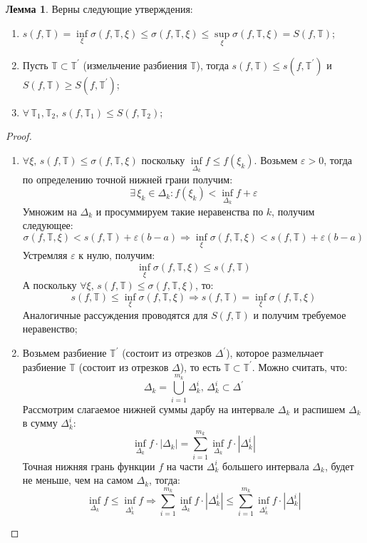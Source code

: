 \documentclass[12pt]{article}
\newcommand{\MTB}{\mathbb{T}}
\newcommand{\VE}{\varepsilon}
\theoremstyle{definition}
\newtheorem{lemma}{Лемма}
\begin{document}
\begin{lemma}
	Верны следующие утверждения:
	\begin{enumerate}[label={(\arabic*)}]
		\item $s(f,\MTB) = \inf\limits_{\xi}\sigma(f,\MTB,\xi) \leq \sigma(f,\MTB,\xi) \leq \sup\limits_{\xi}\sigma(f,\MTB,\xi) = S(f,\MTB)$;
		\item Пусть $\MTB \subset \MTB^\prime$ (измельчение разбиения $\MTB$), тогда $s(f,\MTB) \leq s(f,\MTB^\prime)$ и $S(f,\MTB) \geq S(f,\MTB^\prime)$;
		\item $\forall \, \MTB_1, \MTB_2, \, s(f,\MTB_1) \leq S(f,\MTB_2)$;
	\end{enumerate}
\end{lemma}
\begin{proof}\hfill
	\begin{enumerate}[label={(\arabic*)}]
		\item $\forall \xi, \, s(f,\MTB) \leq \sigma(f,\MTB,\xi)$ поскольку $\inf\limits_{\Delta_k}f \leq f(\xi_k)$. Возьмем $\VE > 0$, тогда по определению точной нижней грани получим:
		$$
			\exists \, \xi_k \in \Delta_k \colon f(\xi_k) < \inf\limits_{\Delta_k}f + \VE
		$$
		Умножим на $\Delta_k$ и просуммируем такие неравенства по $k$, получим следующее:
		$$
			\sigma(f,\MTB,\xi) < s(f,\MTB) + \VE(b-a) \Rightarrow \inf\limits_\xi \sigma(f,\MTB,\xi) < s(f,\MTB) + \VE(b-a)
		$$
		Устремляя $\VE$ к нулю, получим:
		$$
			\inf\limits_\xi \sigma(f,\MTB,\xi) \leq s(f,\MTB)
		$$
		А поскольку $\forall \xi, \, s(f,\MTB) \leq \sigma(f,\MTB,\xi)$, то:
		$$
			s(f,\MTB) \leq \inf\limits_\xi\sigma(f,\MTB,\xi) \Rightarrow s(f,\MTB) = \inf\limits_\xi \sigma(f,\MTB,\xi)
		$$
		Аналогичные рассуждения проводятся для $S(f,\MTB)$ и получим требуемое неравенство;
		\item Возьмем разбиение $\MTB^\prime$ (состоит из отрезков $\Delta^\prime$), которое размельчает разбиение $\MTB$ (состоит из отрезков $\Delta$), то есть $\MTB \subset \MTB^\prime$. Можно считать, что:
		$$
			\Delta_k = \bigcup\limits_{i = 1}^{m_k} \Delta_k^i, \, \Delta_k^i \subset \Delta^\prime
		$$
		Рассмотрим слагаемое нижней суммы дарбу на интервале $\Delta_k$ и распишем $\Delta_k$ в сумму $\Delta_k^i$:
		$$
			\inf\limits_{\Delta_k}f{\cdot}|\Delta_k| = \sum\limits_{i = 1}^{m_k}\inf\limits_{\Delta_k}f{\cdot}|\Delta_k^i|
		$$
		Точная нижняя грань функции $f$ на части $\Delta_k^i$ большего интервала $\Delta_k$, будет не меньше, чем на самом $\Delta_k$, тогда:
		$$
			\inf\limits_{\Delta_k}f \leq \inf\limits_{\Delta_k^i}f
			\Rightarrow \sum\limits_{i = 1}^{m_k}\inf\limits_{\Delta_k}f{\cdot}|\Delta_k^i| \leq \sum\limits_{i = 1}^{m_k}\inf\limits_{\Delta_k^i}f{\cdot}|\Delta_k^i|
$$
\end{enumerate}
\end{proof}
\end{document}
